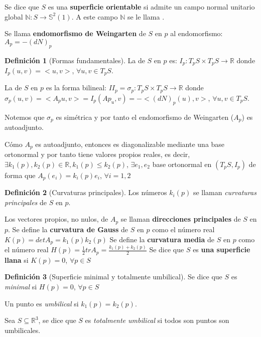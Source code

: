 \documentclass[paper=a4, fontsize=11pt, spanish]{scrartcl}
\newcommand{\rmath}{\mathbb{R}}
\newcommand{\rtres}{\mathbb{R}^3}
\newcommand{\nmath}{\mathds{N}}
\newcommand{\unitsphere}{\mathbb{S}^2(1)}
\theoremstyle{definition}
\theoremstyle{definition}
\newtheorem{definition}{Definición}
\theoremstyle{definition}
\begin{document}
Se dice que $S$ es una \textbf{superficie orientable} si admite un campo normal unitario global $\nmath: S \longrightarrow \unitsphere$. A este campo $\nmath$ se le llama .

Se llama \textbf{endomorfismo de Weingarten} de $S$ en $p$ al endomorfismo: $A_p = -(dN)_p$

\begin{definition}[Formas fundamentales]
La  de $S$ en $p$ es: $I_p: T_pS \times T_pS \longrightarrow \rmath$ donde $I_p(u,v) = <u,v>$, $\forall u,v \in T_pS$.

La  de $S$ en $p$ es la forma bilineal: $II_p = \sigma_p: T_pS \times T_pS \longrightarrow \rmath$ donde $\sigma_p(u,v) = <A_pu,v> = I_p(Ap_u,v) = -<(dN)_p(u), v>$, $\forall u,v \in T_pS$.
\end{definition}

Notemos que $\sigma_p$ es simétrica y por tanto el endomorfismo de Weingarten ($A_p$) es autoadjunto.

Cómo $A_p$ es autoadjunto, entonces es diagonalizable mediante una base ortonormal y por tanto tiene valores propios reales, es decir, $\exists k_1(p), k_2(p) \in \rmath, k_1(p) \leq k_2(p)$, $\exists {e_1,e_2}$ base ortonormal en $(T_pS, I_p)$ de forma que $A_p(e_i) = k_i(p)e_i$, $\forall i = 1,2$

\begin{definition}[Curvaturas principales]
Los números $k_i(p)$ se llaman \textit{curvaturas principales} de $S$ en $p$.
\end{definition}
Los vectores propios, no nulos, de $A_p$ se llaman \textbf{direcciones principales} de $S$ en $p$.
Se define la \textbf{curvatura de Gauss} de $S$ en $p$ como el número real $K(p)=det A_p=k_1(p)k_2(p)$
Se define la \textbf{curvatura media} de $S$ en $p$ como el número real $H(p)=\frac{1}{2}tr A_p=\frac{k_1(p)+k_2(p)}{2}$
Se dice que $S$ es \textbf{una superficie llana} si $K(p)=0$, $\forall p \in S$

\begin{definition}[Superficie minimal y totalmente umbilical]
Se dice que $S$ es \textit{minimal} si $H(p)=0$, $\forall p \in S$

Un punto es \textit{umbilical} si $k_1(p)=k_2(p)$.

Sea $S \subseteq \rtres$, se dice que $S$ es \textit{totalmente umbilical} si todos son puntos son umbilicales.
\end{definition}
\end{document}
